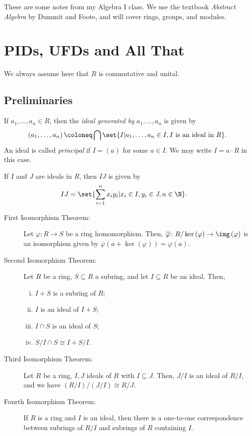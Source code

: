 \documentclass[10pt]{mypackage}
\begin{document}
\RaggedRight
These are some notes from my Algebra I class. We use the textbook \textit{Abstract Algebra} by Dummit and Foote, and will cover rings, groups, and modules.
\section{PIDs, UFDs and All That}%
We always assume here that $R$ is commutative and unital.
\subsection{Preliminaries}%
\begin{definition}
  If $a_1,\dots,a_n\in R$, then the \textit{ideal generated by} $a_1,\dots,a_n$ is given by
  \begin{align*}
    \left( a_1,\dots,a_n \right) \coloneq \bigcap\set{I | a_1,\dots,a_n\in I,I\text{ is an ideal in }R}.
  \end{align*}
  An ideal is called \textit{principal} if $I = \left( a \right)$ for some $a\in I$. We may write $I = a\cdot R$ in this case.
\end{definition}
\begin{definition}
  If $I$ and $J$ are ideals in $R$, then $IJ$ is given by
  \begin{align*}
    IJ &= \set{\sum_{i=1}^{n}x_iy_i | x_i\in I, y_i\in J,n\in \N}.
  \end{align*}
\end{definition}
\begin{theorem}\hfill
  \begin{description}
    \item[First Isomorphism Theorem:] Let $\varphi\colon R\rightarrow S$ be a ring homomorphism. Then, $ \overline{\varphi}\colon R/\ker\left( \varphi \right)\rightarrow \img\left( \varphi \right) $ is an isomorphism given by $ \overline{\varphi}\left( a + \ker\left( \varphi \right) \right) = \varphi\left( a \right) $.
    \item[Second Isomorphism Theorem:] Let $R$ be a ring, $S\subseteq R$ a subring, and let $I\subseteq R$ be an ideal. Then,
      \begin{enumerate}[(i)]
        \item $I + S$ is a subring of $R$;
        \item $I$ is an ideal of $I + S$;
        \item $I\cap S$ is an ideal of $S$;
        \item $S/I\cap S \cong I + S/I$.
      \end{enumerate}
    \item[Third Isomorphism Theorem:] Let $R$ be a ring, $I,J$ ideals of $R$ with $I\subseteq J$. Then, $J/I$ is an ideal of $R/I$, and we have $\left( R/I \right)/\left( J/I \right) \cong R/J$.
    \item[Fourth Isomorphism Theorem:] If $R$ is a ring and $I$ is an ideal, then there is a one-to-one correspondence between subrings of $R/I$ and subrings of $R$ containing $I$.
  \end{description}
\end{theorem}
\end{document}
